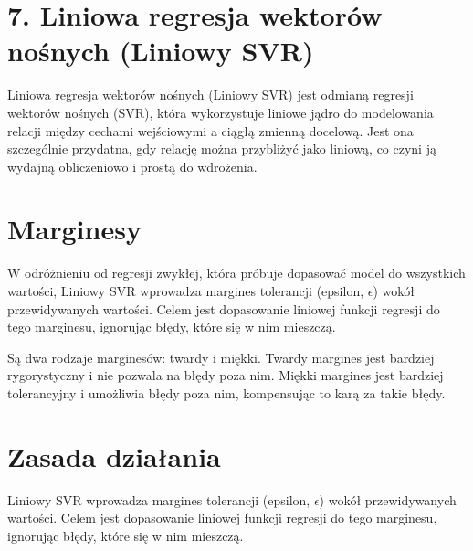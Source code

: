 {}
\justify
\fontsize{14}{16}\selectfont
\setlength{\parindent}{0pt}
\section*{7. Liniowa regresja wektorów nośnych (Liniowy SVR) \cite{alma991000280759708832}}
\label{sec:machine_learning_overview}
\fontsize{12}{14}\selectfont
\vspace{-1.0em}

\hspace{1.5cm} Liniowa regresja wektorów nośnych (Liniowy SVR) jest odmianą regresji wektorów nośnych (SVR), która wykorzystuje liniowe jądro do modelowania relacji między cechami wejściowymi a ciągłą zmienną docelową. Jest ona szczególnie przydatna, gdy relację można przybliżyć jako liniową, co czyni ją wydajną obliczeniowo i prostą do wdrożenia.

{}
\section*{Marginesy}
\vspace{-1.0em}
\label{sec:what_is_ml}

\hspace{1.5cm} W odróżnieniu od regresji zwykłej, która próbuje dopasować model do wszystkich wartości, Liniowy SVR wprowadza margines tolerancji (epsilon, $\epsilon$) wokół przewidywanych wartości. Celem jest dopasowanie liniowej funkcji regresji do tego marginesu, ignorując błędy, które się w nim mieszczą.

Są dwa rodzaje marginesów: twardy i miękki. 
Twardy margines jest bardziej rygorystyczny i nie pozwala na błędy poza nim. Miękki margines jest bardziej tolerancyjny i umożliwia błędy poza nim, kompensując to karą za takie błędy.

{}
\section*{Zasada działania}
\vspace{-1.0em}
\label{sec:what_is_ml}

\hspace{1.5cm} Liniowy SVR wprowadza margines tolerancji (epsilon, $\epsilon$) wokół przewidywanych wartości. Celem jest dopasowanie liniowej funkcji regresji do tego marginesu, ignorując błędy, które się w nim mieszczą.

